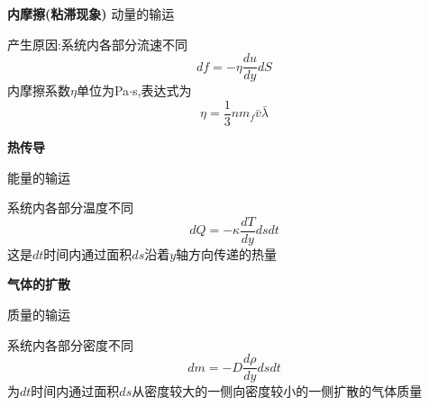 \documentclass[10pt,a4paper]{article}
\begin{document}
\textbf{内摩擦(粘滞现象)}
动量的输运

产生原因:系统内各部分流速不同
\[df=-\eta\frac{du}{dy}dS\]
内摩擦系数$\eta$单位为Pa$\cdot$s,表达式为
\[\eta=\frac{1}{3}nm_f\bar{v}\bar{\lambda}\]

\textbf{热传导}

能量的输运

系统内各部分温度不同
\[dQ=-\kappa \frac{dT}{dy}dsdt\]
这是$dt$时间内通过面积$ds$沿着$y$轴方向传递的热量

\textbf{气体的扩散}

质量的输运

系统内各部分密度不同
\[dm=-D\frac{d\rho}{dy}dsdt\]
为$dt$时间内通过面积$ds$从密度较大的一侧向密度较小的一侧扩散的气体质量
\end{document}
